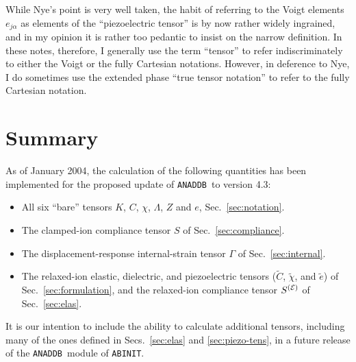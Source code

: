 \documentclass[11pt,fleqn]{article}
\def\wt#1{\widetilde{#1}}
\def\E{{\cal E}}
\def\ABINIT{{{\tt ABINIT}}}
\def\ANADDB{{\tt ANADDB}}
\begin{document}
While Nye's point is very well taken, the habit of
referring to the Voigt elements $e_{j\alpha}$ as elements of the
``piezoelectric tensor'' is by now rather widely ingrained, and in my
opinion it is rather too pedantic to insist on the narrow definition.
In these notes, therefore, I generally use the term ``tensor'' to
refer indiscriminately to either the Voigt or the fully Cartesian
notations.  However, in deference to Nye, I do sometimes use the
extended phase ``true tensor notation'' to refer to the fully
Cartesian notation.


\section{Summary}

As of January 2004, the calculation of the following quantities
has been implemented for the proposed update of \ANADDB\ to version 4.3:

\begin{itemize}
%
\item All six ``bare'' tensors $K$, $C$, $\chi$,
$\Lambda$, $Z$ and $e$, Sec.~\ref{sec:notation}.
%
\item The clamped-ion compliance tensor $S$ of Sec.~\ref{sec:compliance}.
%
\item The displacement-response internal-strain tensor
$\Gamma$ of Sec.~\ref{sec:internal}.
%
\item The relaxed-ion elastic, dielectric, and piezoelectric
tensors ($\wt{C}$, $\wt{\chi}$, and $\wt{e}$) of Sec.~\ref{sec:formulation},
and the relaxed-ion compliance tensor $S^{(\E)}$ of Sec.~\ref{sec:elas}.
%
\end{itemize}

\noindent
It is our intention to include the ability to calculate additional
tensors, including many of the ones defined in Secs.~\ref{sec:elas}
and \ref{sec:piezo-tens}, in a future release of the \ANADDB\ module
of \ABINIT.
\end{document}
